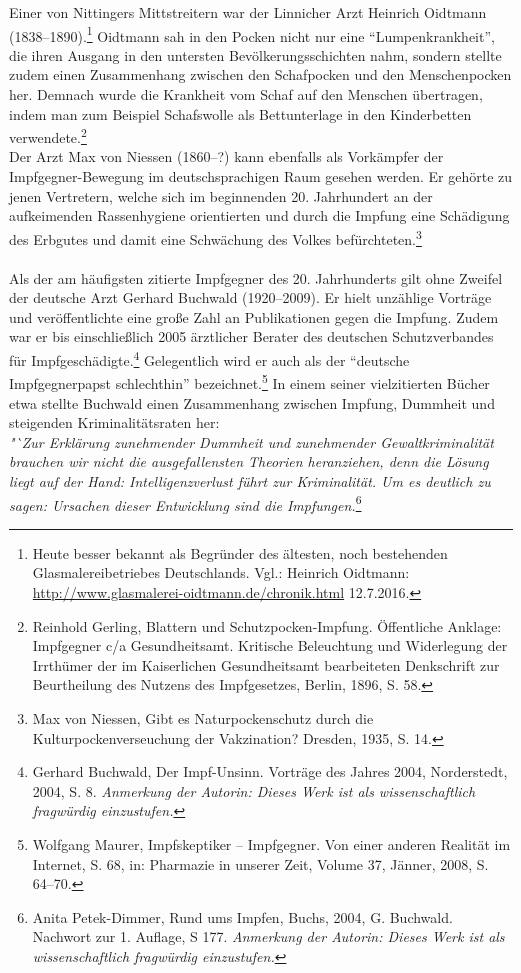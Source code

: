 \documentclass[
    a4paper,
    12pt,
    hyphens,
    chapterprefix=true,
    headheight=33pt,
    footheight=29pt,
    headings=optiontohead, %
]{scrartcl}
\begin{document}
Einer von Nittingers Mittstreitern war der Linnicher Arzt Heinrich Oidtmann (1838--1890).\footnote{Heute besser bekannt als Begründer des ältesten, noch bestehenden Glasmalereibetriebes Deutschlands. Vgl.: Heinrich Oidtmann: \url{http://www.glasmalerei-oidtmann.de/chronik.html} 12.7.2016.} Oidtmann sah in den Pocken nicht nur eine "`Lumpenkrankheit"', die ihren Ausgang in den untersten Bevölkerungsschichten nahm, sondern stellte zudem einen Zusammenhang zwischen den Schafpocken und den Menschenpocken her. Demnach wurde die Krankheit vom Schaf auf den Menschen übertragen, indem man zum Beispiel Schafswolle als Bettunterlage in den Kinderbetten verwendete.\footnote{Reinhold Gerling, Blattern und Schutzpocken-Impfung. Öffentliche Anklage: Impfgegner c/a Gesundheitsamt. Kritische  Beleuchtung  und  Widerlegung  der  Irrthümer der  im  Kaiserlichen  Gesundheitsamt  bearbeiteten  Denkschrift  zur Beurtheilung  des  Nutzens  des  Impfgesetzes, Berlin, 1896, S. 58.}\\
Der Arzt Max von Niessen (1860--?) kann ebenfalls als Vorkämpfer der Impfgegner-Bewegung im  deutschsprachigen Raum gesehen werden. Er gehörte zu jenen Vertretern, welche sich im beginnenden 20. Jahrhundert an der aufkeimenden Rassenhygiene orientierten und durch die Impfung eine Schädigung des Erbgutes und damit eine Schwächung des Volkes befürchteten.\footnote{Max von Niessen, Gibt es Naturpockenschutz durch die Kulturpockenverseuchung der Vakzination? Dresden, 1935, S. 14.}\\
\\
Als der am häufigsten zitierte Impfgegner des 20. Jahrhunderts gilt ohne Zweifel der deutsche Arzt Gerhard Buchwald (1920--2009). Er hielt unzählige Vorträge und veröffentlichte eine große Zahl an Publikationen gegen die Impfung. Zudem war er bis einschließlich 2005 ärztlicher Berater des deutschen Schutzverbandes für Impfgeschädigte.\footnote{Gerhard Buchwald, Der Impf-Unsinn. Vorträge des Jahres 2004, Norderstedt, 2004, S. 8. \textit{Anmerkung der Autorin: Dieses Werk ist als wissenschaftlich fragwürdig einzustufen.}} Gelegentlich wird er auch als der "`deutsche Impfgegnerpapst schlechthin"' bezeichnet.\footnote{Wolfgang Maurer, Impfskeptiker -- Impfgegner. Von einer anderen Realität im Internet, S. 68, in: Pharmazie in unserer Zeit, Volume 37, Jänner, 2008, S. 64--70.} In einem seiner vielzitierten Bücher etwa stellte Buchwald einen Zusammenhang zwischen Impfung, Dummheit und steigenden Kriminalitätsraten her:\\
\textit{"`Zur Erklärung zunehmender Dummheit und zunehmender Gewaltkriminalität brauchen wir nicht die ausgefallensten Theorien heranziehen, denn die Lösung liegt auf der Hand: Intelligenzverlust führt zur Kriminalität. Um es deutlich zu sagen: Ursachen dieser Entwicklung sind die Impfungen.\grqq}\footnote{Anita Petek-Dimmer, Rund ums Impfen, Buchs, 2004, G. Buchwald. Nachwort zur 1. Auflage, S 177. \textit{Anmerkung der Autorin: Dieses Werk ist als wissenschaftlich fragwürdig einzustufen.}}\\
\end{document}
